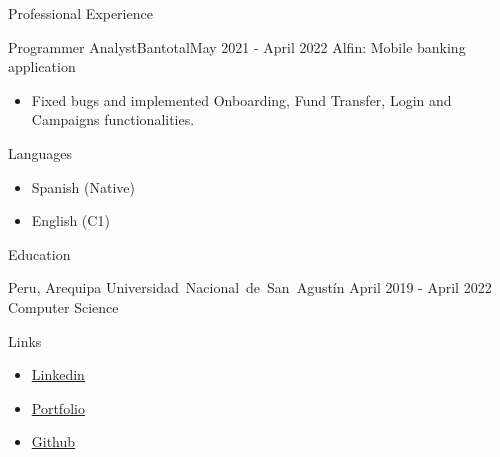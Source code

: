 \documentclass[]{mcdowell-cv/mcdowellcv}
\begin{document}
\begin{cvsection}{Professional Experience}
\begin{cvsubsection}{Programmer Analyst}{Bantotal}{May 2021 - April 2022}
            Alfin: Mobile banking application
            \begin{itemize}
                \item Fixed bugs and implemented Onboarding,
                Fund Transfer, Login and Campaigns functionalities.
            \end{itemize}

        \end{cvsubsection}
    \end{cvsection}

    \begin{cvsection}{Languages}
        \begin{cvsubsection}{}{}{}
            \begin{itemize}
                \item Spanish (Native)
                \item English (C1)
            \end{itemize}
        \end{cvsubsection}
    \end{cvsection}

    \begin{cvsection}{Education}
        \begin{cvsubsection}
        {Peru, Arequipa}
        {\mbox{Universidad Nacional de San Agustín}}
        {April 2019 - April 2022}
            Computer Science
        \end{cvsubsection}
    \end{cvsection}

    \begin{cvsection}{Links}
        \begin{cvsubsection}{}{}{}
            \begin{itemize}
                \item \href{https://www.linkedin.com/in/luis-angel-prado-postigo-813916231/}{Linkedin}
                \item \href{https://luis-prado-portfolio.netlify.app/}{Portfolio}
                \item \href{https://github.com/lpradopostigo}{Github}
            \end{itemize}
        \end{cvsubsection}
    \end{cvsection}
\end{document}

